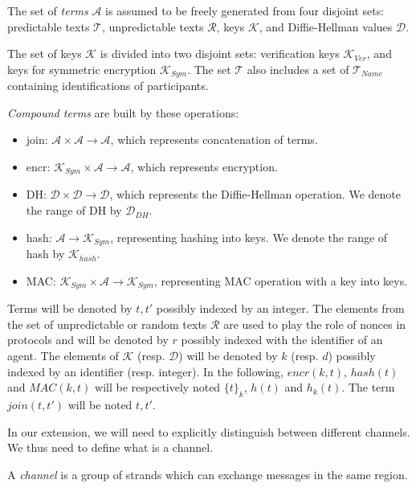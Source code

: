 \begin{Definition}
The set of \emph{terms} $\mathcal{A}$ is assumed to be freely generated from four disjoint sets: predictable texts $\mathcal{T}$, unpredictable texts $\mathcal{R}$,  keys $\mathcal{K}$, and Diffie-Hellman values $\mathcal{D}$.

The set of keys $\mathcal{K}$ is divided into two disjoint sets: verification keys $\mathcal{K}_{Ver}$, and keys for symmetric encryption $\mathcal{K}_{Sym}$. The set $\mathcal{T}$ also includes a set of $\mathcal{T}_{Name}$ containing identifications of participants. 

\emph{Compound terms} are built by these operations:
\begin{itemize} 
\item join: $\mathcal{A} \times \mathcal{A} \rightarrow \mathcal{A}$, which represents concatenation of terms. 
\item encr: $\mathcal{K}_{Sym} \times \mathcal{A} \rightarrow \mathcal{A}$, which represents encryption. 
\item DH: $\mathcal{D} \times \mathcal{D} \rightarrow \mathcal{D}$, which represents the Diffie-Hellman operation. We denote the range of DH by $\mathcal{D}_{DH}$.
\item hash: $\mathcal{A} \rightarrow \mathcal{K}_{Sym}$, representing hashing into keys. We denote the range of hash by $\mathcal{K}_{hash}$. 
\item MAC: $\mathcal{K}_{Sym} \times \mathcal{A}  \rightarrow \mathcal{K}_{Sym}$, representing MAC operation with a key into keys.
\end{itemize}
\end{Definition} 

Terms will be denoted by $t, t'$ possibly indexed by an integer. 
The elements from the set of unpredictable or random texts $\mathcal{R}$ are used to play the role of nonces in protocols and will be denoted by $r$ possibly indexed with the identifier of an agent. The elements of $\mathcal{K}$ (resp. $\mathcal{D}$) will be denoted by $k$ (resp. $d$) possibly indexed by an identifier (resp. integer). In the following, $encr(k,t)$, $hash(t)$ and $MAC(k,t)$ will be respectively noted ${\{t\}}_k$, $h(t)$ and $h_k(t)$. The term $join(t,t')$ will be noted $t,t'$. 

In our extension, we will need to explicitly distinguish between different channels. We thus need to define what is a channel.

\begin{Definition}[Channel] A \emph{channel} is a group of strands which can exchange messages in the same region.
\end{Definition} 

